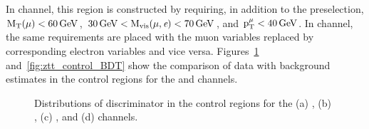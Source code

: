 In \mue channel, this region is constructed by requiring, in addition to the preselection, $\text{M}_\mathrm{T}(\mu) < 60 \,\text{Ge\hspace{-.08em}V}$, $30 \,\text{Ge\hspace{-.08em}V} < \text{M}_{\text{vis}}(\mu, \textit{e}) < 70 \,\text{Ge\hspace{-.08em}V}$, and $\text{p}_\text{T}^{\mu} < 40 \,\text{Ge\hspace{-.08em}V}$. In \emu channel, the same requirements are placed with the muon variables replaced by corresponding electron variables and vice versa. Figures~\ref{fig:ztt_control} and~\ref{fig:ztt_control_BDT} show the comparison of data with background estimates in the \Ztt control regions for the \Hmt and \Het channels.

\begin{figure}[htbp!]
  \centering
  \caption{Distributions of \mcol discriminator in the \Ztt control regions for the (a) \muhad, (b) \mue, (c) \ehad, and (d) \emu channels.}
  \label{fig:ztt_control}
\end{figure}


